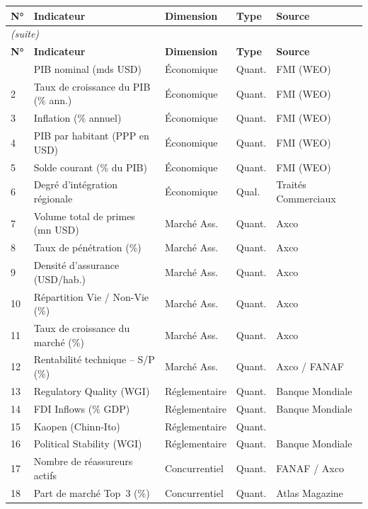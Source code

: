 \documentclass[12pt,a4paper]{report}
\begin{document}
\begin{longtable}{@{}p{0.5cm}p{4.5cm}p{3cm}p{1.6cm}p{2.8cm}@{}}
\toprule
\textbf{N°} & \textbf{Indicateur} & \textbf{Dimension} & \textbf{Type} & \textbf{Source} \\
\midrule
\endfirsthead
\multicolumn{5}{l}{\small\itshape (suite)}\\\toprule
\textbf{N°} & \textbf{Indicateur} & \textbf{Dimension} & \textbf{Type} & \textbf{Source}\\\midrule
\endhead
\bottomrule\endfoot
1  & PIB nominal (mds USD)               & Économique      & Quant. & FMI (WEO) \\
2  & Taux de croissance du PIB (\% ann.) & Économique      & Quant. & FMI (WEO) \\
3  & Inflation (\% annuel)               & Économique      & Quant. & FMI (WEO) \\
4  & PIB par habitant (PPP en USD)       & Économique      & Quant. & FMI (WEO) \\
5  & Solde courant (\% du PIB)           & Économique      & Quant. & FMI (WEO) \\
6  & Degré d'intégration régionale       & Économique      & Qual.  & Traités Commerciaux \\
\midrule
7  & Volume total de primes (mn USD)     & Marché Ass.     & Quant. & Axco \\
8  & Taux de pénétration (\%)            & Marché Ass.     & Quant. & Axco \\
9  & Densité d'assurance (USD/hab.)      & Marché Ass.     & Quant. & Axco \\
10 & Répartition Vie / Non-Vie (\%)      & Marché Ass.     & Quant. & Axco \\
11 & Taux de croissance du marché (\%)   & Marché Ass.     & Quant. & Axco \\
12 & Rentabilité technique -- S/P (\%)   & Marché Ass.     & Quant. & Axco / FANAF \\
\midrule
13 & Regulatory Quality (WGI)            & Réglementaire   & Quant. & Banque Mondiale \\
14 & FDI Inflows (\% GDP)                & Réglementaire   & Quant. & Banque Mondiale \\
15 & Kaopen (Chinn-Ito)                  & Réglementaire   & Quant. & \citet{ChinnIto2006} \\
16 & Political Stability (WGI)           & Réglementaire   & Quant. & Banque Mondiale \\
\midrule
17 & Nombre de réassureurs actifs        & Concurrentiel   & Quant. & FANAF / Axco \\
18 & Part de marché Top~3 (\%)           & Concurrentiel   & Quant. & Atlas Magazine \\
\end{longtable}
\end{document}

